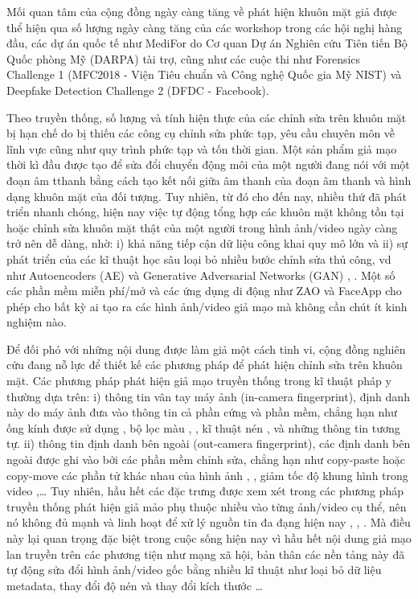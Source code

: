\documentclass{article}
\begin{document}
Mối quan tâm của cộng đồng ngày càng tăng về phát hiện khuôn mặt giả được thể hiện qua số lượng ngày càng tăng của các workshop trong các hội nghị hàng đầu, các dự án quốc tế như MediFor do Cơ quan Dự án Nghiên cứu Tiên tiến Bộ Quốc phòng Mỹ (DARPA) tài trợ, cũng như các cuộc thi như Forensics Challenge 1 (MFC2018 - Viện Tiêu chuẩn và Công nghệ Quốc gia Mỹ NIST) và Deepfake Detection Challenge 2 (DFDC - Facebook).

Theo truyền thống, số lượng và tính hiện thực của các chỉnh sửa trên khuôn mặt bị hạn chế do bị thiếu các công cụ chỉnh sửa phức tạp, yêu cầu chuyên môn về lĩnh vực cũng như quy trình phức tạp và tốn thời gian. Một sản phẩm giả mạo thời kì đầu được tạo để sửa đổi chuyển động môi của một người đang nói với một đoạn âm tthanh bằng cách tạo kết nối giữa âm thanh của đoạn âm thanh và hình dạng khuôn mặt của đối tượng. Tuy nhiên, từ đó cho đến nay, nhiều thứ đã phát triển nhanh chóng, hiện nay việc tự động tổng hợp các khuôn mặt không tồn tại hoặc chỉnh sửa khuôn mặt thật của một người trong hình ảnh/video ngày càng trở nên dễ dàng, nhờ: i) khả năng tiếp cận dữ liệu công khai quy mô lớn và ii) sự phát triển của các kĩ thuật học sâu loại bỏ nhiều bước chỉnh sửa thủ công, vd như Autoencoders (AE) và Generative Adversarial Networks (GAN) , . Một số các phần mềm miễn phí/mở và các ứng dụng di động như ZAO và FaceApp cho phép cho bất kỳ ai tạo ra các hình ảnh/video giả mạo mà không cần chút ít kinh nghiệm nào.

Để đối phó với những nội dung được làm giả một cách tinh vi, cộng đồng nghiên cứu đang nỗ lực để thiết kế các phương pháp để phát hiện chỉnh sửa trên khuôn mặt. Các phương pháp phát hiện giả mạo truyền thống trong kĩ thuật pháp y thường dựa trên: i) thông tin vân tay máy ảnh (in-camera fingerprint), định danh này do máy ảnh đưa vào thông tin cả phần cứng và phần mềm, chẳng hạn như ống kính được sử dụng , bộ lọc màu , , kĩ thuật nén ,  và những thông tin tương tự. ii) thông tin định danh bên ngoài (out-camera fingerprint), các định danh bên ngoài được ghi vào bởi các phần mềm chỉnh sửa, chẳng hạn như copy-paste hoặc copy-move các phần tử khác nhau của hình ảnh , , giảm tốc độ khung hình trong video   ,… Tuy nhiên, hầu hết các đặc trưng được xem xét trong các phương pháp truyền thống phát hiện giả mảo phụ thuộc nhiều vào từng ảnh/video cụ thể, nên nó không đủ mạnh và linh hoạt để xử lý nguồn tin đa đạng hiện nay , , . Mà điều này lại quan trọng đặc biệt trong cuộc sống hiện nay vì hầu hết nội dung giả mạo lan truyền trên các phương tiện như mạng xã hội, bản thân các nền tảng này đã tự động sửa đổi hình ảnh/video gốc bằng nhiều kĩ thuật như loại bỏ dữ liệu metadata, thay đổi độ nén và thay đổi kích thước …
\end{document}
